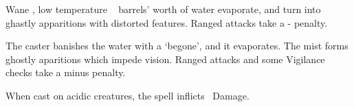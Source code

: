 
  {\mWater}%
  {Wane}%
  {\duplicated, \detailed}%
  {low temperature}%
  {\spellArea\  barrels' worth of water evaporate, and turn into ghastly apparitions with distorted features.  Ranged attacks take a - penalty.}%
  {
    The caster banishes the water with a `begone', and it evaporates.
    The mist forms ghostly aparitions which impede vision.
    Ranged attacks and some Vigilance checks take a minus  penalty.

  When cast on acidic creatures, the spell inflicts \rollConv\ Damage.
    }

